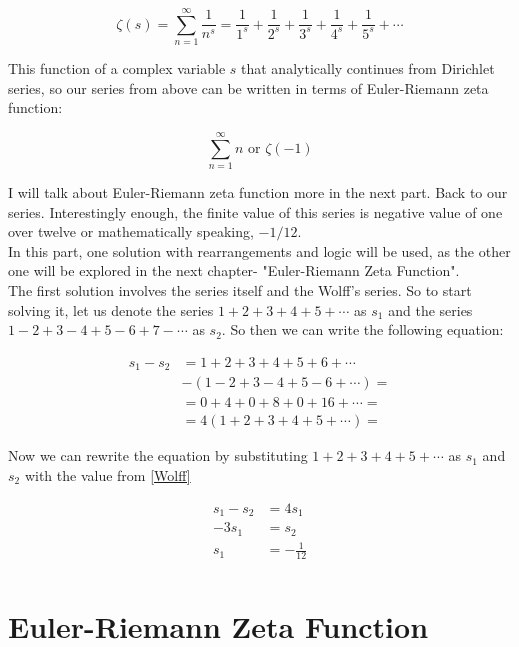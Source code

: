 \documentclass[a4paper]{article}
\begin{document}
\begin{equation}
  \zeta(s)=\sum_{n=1}^{\infty} \frac{1}{n^s}=\frac{1}{1^s}+\frac{1}{2^s}+\frac{1}{3^s}+\frac{1}{4^s}+\frac{1}{5^s}+\cdots
  \label{zetaf}
\end{equation}

This function of a complex variable $s$ that analytically continues from
Dirichlet series, so our series from above can be written in terms of
Euler-Riemann zeta function: 

\begin{equation}
  \sum_{n=1}^{\infty} n \text{ or } \zeta(-1)
  \end{equation}

I will talk about Euler-Riemann zeta function more in the next part. Back to our
series. Interestingly enough, the finite value of this series is negative value
of one over twelve or mathematically speaking, $-1/12$.\\

In this part, one solution with rearrangements and logic will be used, as the
other one will be explored in the next chapter- "Euler-Riemann Zeta
Function".\\

The first solution involves the series itself and the Wolff's series. So to
start solving it, let us denote the series $1+2+3+4+5+\cdots$ as $s_1$ and the
series $1-2+3-4+5-6+7-\cdots$ as $s_2$. So then we can write the following equation: 

\begin{align*}
  s_1-s_2&=1+2+3+4+5+6+\cdots\\
  &-(1-2+3-4+5-6+\cdots)=\\
  &=0+4+0+8+0+16+\cdots=\\
  &=4(1+2+3+4+5+\cdots)=
\end{align*}

Now we can rewrite the equation by substituting $1+2+3+4+5+\cdots$ as $s_1$ and
$s_2$ with the value from \ref{Wolff}

\begin{align*}
  s_1-s_2&=4s_1\\
  -3s_1&=s_2\\
  s_1&=-\frac{1}{12}\\
  \end{align*}

\section{Euler-Riemann Zeta Function}
\label{sec-5}
\end{document}
